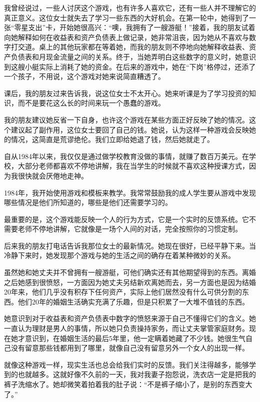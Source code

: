 我曾经说过，一些人讨厌这个游戏，也有许多人喜欢它，还有一些人并不理解它的真正意义。这位女士就失去了学习一些东西的大好机会。在第一轮中，她得到了一张“零星支出”卡，开始她很高兴：“噢，我拥有了一艘游艇！”接着，我的朋友试着向她解释如何在收益表和资产负债表上做记录，她非常沮丧，因为她从不喜欢与数字打交道。桌上的其他玩家都在等着她，而我的朋友则不停地向她解释收益表、资产负债表和月现金流量之间的关系。终于，当她弄明白这些数字的意义时，她意识到这艘小艇实际上消耗了她的资金。在后来的游戏中，她在“下岗”格停过，还添了一个孩子，不用说，这个游戏对她来说简直糟透了。

课后，我的朋友过来告诉我，说这位女士不太开心。她来听课是为了学习投资的知识，而不是要花这么长的时间来玩一个愚蠢的游戏。

我的朋友建议她反省一下自身，也许这个游戏在某些方面正好反映了她的情况。这个建议起了副作用，这位女士要回了自己的钱。她说，认为这样一种游戏会反映她的情况，这简直是荒谬绝伦。我们立即给她退了钱，然后她就走了。

自从1984年以来，我仅仅是通过做学校教育没做的事情，就赚了数百万美元。在学校，大部分老师都喜欢不停地讲解，我在当学生的时候就不喜欢这种授课方式，因为我很快就会厌倦地走神。

1984年，我开始使用游戏和模板来教学。我常常鼓励我的成人学生要从游戏中发现哪些情况是他们所知道的，哪些是他们还需要学习的。

最重要的是，这个游戏能反映一个人的行为方式，它是一个实时的反馈系统。它不需要老师不停地讲解，它就像是一场个人间的对话，完全按照你的习惯定制。

后来我的朋友打电话告诉我那位女士的最新情况。她现在很好，已经平静下来。当冷静下来时，她发现那个游戏与她的生活之间的确存在着某种微妙的关系。

虽然她和她丈夫并不曾拥有一艘游艇，可他们确实还有其他期望得到的东西。离婚之后她感到很愤怒，一方面因为她丈夫另结新欢离她而去，另一方面也是因为结婚20年来，他们几乎没有积存下任何资产，实际上他们居然没有什么可供分割的东西。他们20年的婚姻生活确实充满了乐趣，但是只积累了一大堆不值钱的东西。

她意识到对于收益表和资产负债表中数字的愤怒来源于自己不懂得它们的含义。她一直认为理财是男人的事情，所以她只负责操持家务，而让丈夫掌管家庭财务。现在她才意识到，在婚姻生活的最后5年里，他一定瞒着她藏了不少钱。她很生气自己没有留意那些钱都用到了哪里，就像自己没有留意另外一个女人的出现一样。

就像这种游戏一样，现实生活也总会给我们实时的反馈。我们关注得越多，能够学到的也就越多。这就好像不久前的一天，我对我妻子抱怨说，洗衣店一定是把我的裤子洗缩水了。她却微笑着拍着我的肚子说：“不是裤子缩小了，是别的东西变大了。”

